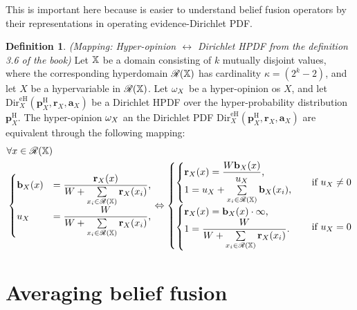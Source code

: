 \documentclass[a4paper,12pt]{article}
\theoremstyle{definition}
\newtheorem{definition}{Definition}[section]
\theoremstyle{theorem}
\numberwithin{equation}{section}
\begin{document}
This is important here because is easier to understand belief fusion operators by their representations in operating evidence-Dirichlet PDF.

\begin{definition}\label{def:mapping}
\emph{(Mapping: Hyper-opinion $\leftrightarrow$ Dirichlet HPDF from the definition 3.6 of the book)} Let $\mathbb{X}$ be a domain consisting of $k$ mutually disjoint values, where the corresponding hyperdomain $\mathcal{R}(\mathbb{X})$ has cardinality $\kappa = (2^{k} - 2)$, and let $X$ be a hypervariable in $\mathcal{R}(\mathbb{X})$. Let $\omega_{X}$ be a hyper-opinion os $X$, and let $\mathrm{Dir}^{\mathrm{eH}}_X(\mathbf{p}^{\mathrm{H}}_X, \mathbf{r}_X, \mathbf{a}_X)$ be a Dirichlet HPDF over the hyper-probability distribution $\mathbf{p}^{\mathrm{H}}_X$. The hyper-opinion $\omega_{X}$ an the Dirichlet PDF $\mathrm{Dir}^{\mathrm{eH}}_X(\mathbf{p}^{\mathrm{H}}_X, \mathbf{r}_X, \mathbf{a}_X)$ are equivalent through the following mapping:
\begin{equation}
\begin{split}
& \forall x \in \mathcal{R}(\mathbb{X}) \\
& \begin{cases}
\mathbf{b}_{X}(x) & = \dfrac{\mathbf{r}_X(x)}{W + \sum\limits_{x_i \in \mathcal{R}(\mathbb{X})} \mathbf{r}_X(x_i)} \text{,} \\
u_X & = \dfrac{W}{W + \sum\limits_{x_i \in \mathcal{R}(\mathbb{X})} \mathbf{r}_X(x_i)} \text{,}
\end{cases} \Leftrightarrow
\begin{cases}
\begin{cases}
\mathbf{r}_X(x) = \dfrac{W \mathbf{b}_{X}(x)}{u_X} \text{,} \\
1 = u_X + \sum\limits_{x_i \in \mathcal{R}(\mathbb{X})} \mathbf{b}_{X}(x_i) \text{,}
\end{cases} & \text{if } u_X \neq 0 \\
\begin{cases}
\mathbf{r}_X(x) = \mathbf{b}_{X}(x) \cdot \infty \text{,} \\
1 = \dfrac{W}{W + \sum\limits_{x_i \in \mathcal{R}(\mathbb{X})} \mathbf{r}_X(x_i)} \text{.}
\end{cases} & \text{if } u_X = 0
\end{cases}
\end{split}
\end{equation}
\end{definition}


\section{Averaging belief fusion}
\end{document}
